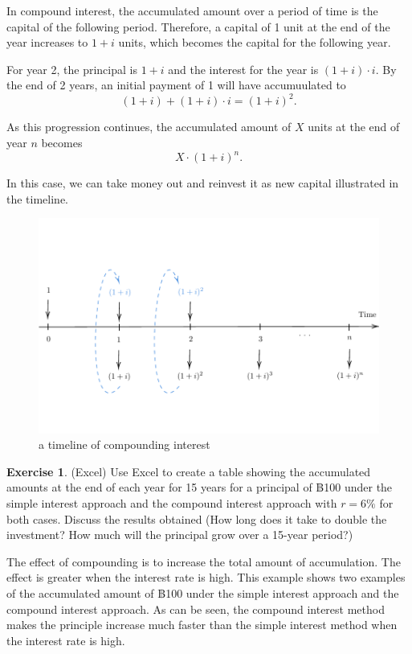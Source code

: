 \documentclass[
]{book}
\theoremstyle{definition}
\theoremstyle{definition}
\theoremstyle{definition}
\newtheorem{exercise}{Exercise}[chapter]
\theoremstyle{definition}
\theoremstyle{remark}
\begin{document}
In compound interest, the accumulated amount over a period of time is the capital of the following period. Therefore, a capital of 1 unit at the end of the year increases to \(1 + i\) units, which becomes the capital for the following year.

For year 2, the principal is \(1 + i\) and the interest for the year is
\(( 1 + i ) \cdot i\). By the end of 2 years, an initial payment of 1 will have accumuulated to
\[ (1+i) + ( 1 + i ) \cdot i = (1+i)^2.\]

As this progression continues, the accumulated amount of \(X\) units at the end of year \(n\) becomes
\[ X\cdot(1 + i)^n. \]

\theNote In this case, we can take money out and reinvest it as new capital illustrated in the timeline.

\begin{figure}

{\centering \includegraphics{SCMA266Bookdownproj_files/figure-latex/tikz-ex2-1} 

}

\caption{a timeline of compounding interest}\label{fig:tikz-ex2}
\end{figure}

\begin{exercise}
(Excel) Use Excel to create a table showing the accumulated amounts at the end of each year for 15 years for a principal of ฿100 under the simple interest approach and the compound interest approach with \(r = 6\%\) for both cases.
Discuss the results obtained (How long does it take to double the investment? How much will the principal grow over a 15-year period?)
\end{exercise}

The effect of compounding is to increase the total amount of accumulation. The effect is greater when the interest rate is high. This example shows two examples of the accumulated amount of ฿100 under the simple interest approach and the compound interest approach. As can be seen, the compound interest method makes the principle increase much faster than the simple interest method when the interest rate is high.
\end{document}
